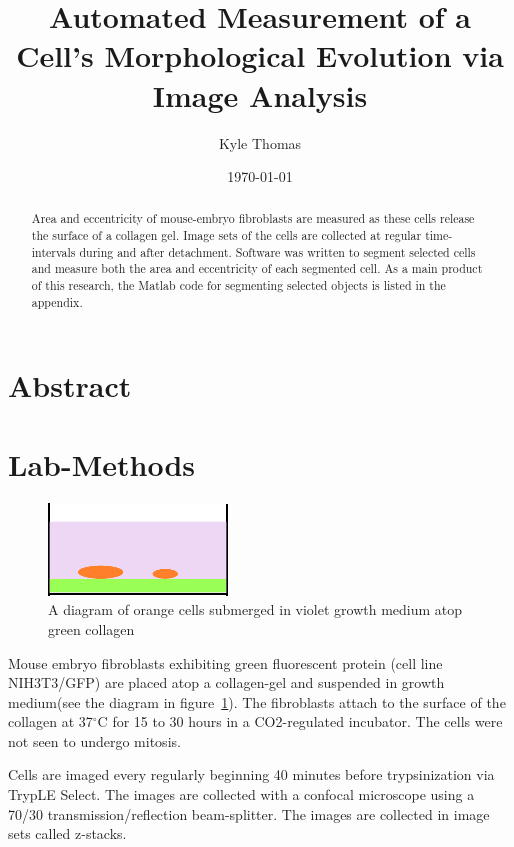 \documentclass[twocolumn,notitlepage]{revtex4-1}
\begin{document}
\title{Automated Measurement of a Cell's Morphological Evolution via Image Analysis}
\author{Kyle Thomas}
\date{\today}

\onecolumngrid
\section*{Abstract}
\begin{abstract}
\begin{center}
	Area and eccentricity of mouse-embryo fibroblasts are measured as these cells release the surface of a collagen gel. Image sets of the cells are collected at regular time-intervals during and after detachment. Software was written to segment selected cells and measure both the area and eccentricity of each segmented cell. As a main product of this research, the Matlab code for segmenting selected objects is listed in the appendix.
\end{center}
\end{abstract}
\maketitle
\twocolumngrid

\section*{Lab-Methods}
\begin{figure}
  \centering
  \caption{\label{fig:cellDiagram}A diagram of orange cells submerged in violet growth medium atop green collagen}
  \includegraphics[clip=true,width=.4\textwidth]{img/cells-diagram}
\end{figure}

Mouse embryo fibroblasts exhibiting green fluorescent protein (cell line NIH3T3/GFP) are placed atop a collagen-gel and suspended in growth medium(see the diagram in figure~\ref{fig:cellDiagram}). The fibroblasts attach to the surface of the collagen at 37$^\circ$C for 15 to 30 hours in a CO2-regulated incubator. The cells were not seen to undergo mitosis.

Cells are imaged every regularly beginning 40 minutes before trypsinization via TrypLE Select. The images are collected with a confocal microscope using a 70/30 transmission/reflection beam-splitter. The images are collected in image sets called z-stacks.
\end{document}
